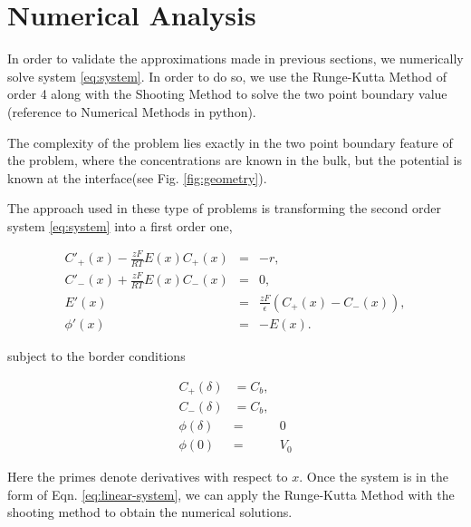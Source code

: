 


\section{Numerical Analysis}

In order to validate the approximations made in previous sections, we numerically solve system \ref{eq:system}. In order to do so, we use the Runge-Kutta Method of order 4 along with the  Shooting Method to solve the two point boundary value (reference to Numerical Methods in python).  



The complexity of the problem lies exactly in the two point boundary feature of the problem, where the concentrations are known in the bulk, but the potential is known at the interface(see Fig. \ref{fig:geometry}). 

The approach used in these type of problems is transforming the second order system \ref{eq:system} into a first order one,

\begin{eqnarray}
C'_+(x)-\frac{zF}{RT}E(x)C_+(x) &=& -r, \\
C'_-(x)+\frac{zF}{RT}E(x)C_-(x) &=& 0, \\
E'(x) &=& \frac{zF}{\epsilon}(C_+(x)-C_-(x)), \\
\phi'(x) &=& -E(x).
\label{eq:linear-system}
\end{eqnarray}

subject to the border conditions

\begin{eqnarray}
C_+(\delta) &= C_b,  \\
C_-(\delta) &= C_b, \\
\phi(\delta) &=& 0\\
\phi(0) &=&  V_0
\label{eq:linear-system-bc}
\end{eqnarray}

Here the primes denote derivatives with respect to $x$. Once the system is in the form of Eqn. \ref{eq:linear-system}, we can apply the Runge-Kutta Method with the shooting method to obtain the numerical solutions. 




